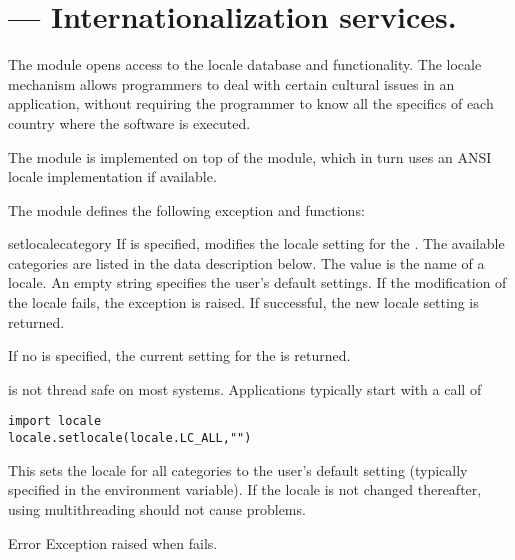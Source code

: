 \section{ ---
         Internationalization services.}




The  module opens access to the \POSIX{} locale database
and functionality. The \POSIX{} locale mechanism allows programmers
to deal with certain cultural issues in an application, without
requiring the programmer to know all the specifics of each country
where the software is executed.

The  module is implemented on top of the
 module, which in turn uses an
ANSI \C{} locale implementation if available.

The  module defines the following exception and
functions:


\begin{funcdesc}{setlocale}{category}
If  is specified, modifies the locale setting for the
. The available categories are listed in the data
description below. The value is the name of a locale. An empty string
specifies the user's default settings. If the modification of the
locale fails, the exception  is
raised. If successful, the new locale setting is returned.

If no  is specified, the current setting for the
 is returned.

 is not thread safe on most systems. Applications
typically start with a call of
\begin{verbatim}
import locale
locale.setlocale(locale.LC_ALL,"")
\end{verbatim}
This sets the locale for all categories to the user's default setting
(typically specified in the  environment variable). If the
locale is not changed thereafter, using multithreading should not
cause problems.
\end{funcdesc}

\begin{excdesc}{Error}
Exception raised when  fails.
\end{excdesc}

